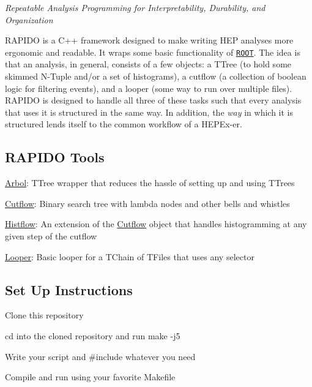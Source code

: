 {\itshape Repeatable Analysis Programming for Interpretability, Durability, and Organization}

\href{https://opensource.org/licenses/MIT}{\tt } \href{https://jkguiang.github.io/rapido/html/index.html}{\tt } \href{https://www.codefactor.io/repository/github/jkguiang/rapido/overview/master}{\tt }

R\+A\+P\+I\+DO is a C++ framework designed to make writing H\+EP analyses more ergonomic and readable. It wraps some basic functionality of \href{https://root.cern/}{\tt R\+O\+OT}. The idea is that an analysis, in general, consists of a few objects\+: a T\+Tree (to hold some skimmed N-\/\+Tuple and/or a set of histograms), a cutflow (a collection of boolean logic for filtering events), and a looper (some way to run over multiple files). R\+A\+P\+I\+DO is designed to handle all three of these tasks such that every analysis that uses it is structured in the same way. In addition, the {\itshape way} in which it is structured lends itself to the common workflow of a H\+E\+P\+Ex-\/er.

\subsection*{R\+A\+P\+I\+DO Tools}


\begin{DoxyEnumerate}
\item \hyperlink{classArbol}{Arbol}\+: T\+Tree wrapper that reduces the hassle of setting up and using T\+Trees
\item \hyperlink{classCutflow}{Cutflow}\+: Binary search tree with lambda nodes and other bells and whistles
\begin{DoxyItemize}
\item \hyperlink{classHistflow}{Histflow}\+: An extension of the \hyperlink{classCutflow}{Cutflow} object that handles histogramming at any given step of the cutflow
\end{DoxyItemize}
\item \hyperlink{classLooper}{Looper}\+: Basic looper for a T\+Chain of T\+Files that uses any selector
\end{DoxyEnumerate}

\subsection*{Set Up Instructions}


\begin{DoxyEnumerate}
\item Clone this repository
\item {\ttfamily cd} into the cloned repository and run {\ttfamily make -\/j5}
\item Write your script and {\ttfamily \#include} whatever you need
\item Compile and run using your favorite {\ttfamily Makefile}
\end{DoxyEnumerate}

